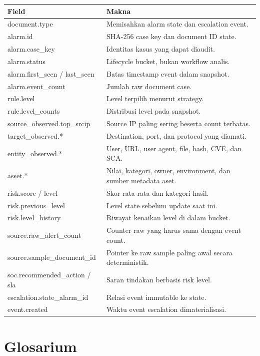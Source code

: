\documentclass[11pt,a4paper,oneside]{report}
\begin{document}
\begin{longtable}{>{\ttfamily\raggedright\arraybackslash}p{}p{}}
\toprule
\normalfont\textbf{Field} & \textbf{Makna}\\
\midrule
\endhead
document.type & Memisahkan alarm state dan escalation event.\\
alarm.id & SHA-256 case key dan document ID state.\\
alarm.case\_key & Identitas kasus yang dapat diaudit.\\
alarm.status & Lifecycle bucket, bukan workflow analis.\\
alarm.first\_seen / last\_seen & Batas timestamp event dalam snapshot.\\
alarm.event\_count & Jumlah raw document case.\\
rule.level & Level terpilih menurut strategy.\\
rule.level\_counts & Distribusi level pada snapshot.\\
source\_observed.top\_srcip & Source IP paling sering beserta count terbatas.\\
target\_observed.* & Destination, port, dan protocol yang diamati.\\
entity\_observed.* & User, URL, user agent, file, hash, CVE, dan SCA.\\
asset.* & Nilai, kategori, owner, environment, dan sumber metadata aset.\\
risk.score / level & Skor rata-rata dan kategori hasil.\\
risk.previous\_level & Level state sebelum update saat ini.\\
risk.level\_history & Riwayat kenaikan level di dalam bucket.\\
source.raw\_alert\_count & Counter raw yang harus sama dengan event count.\\
source.sample\_document\_id & Pointer ke raw sample paling awal secara deterministik.\\
soc.recommended\_action / sla & Saran tindakan berbasis risk level.\\
escalation.state\_alarm\_id & Relasi event immutable ke state.\\
event.created & Waktu event escalation dimaterialisasi.\\
\bottomrule
\end{longtable}

\chapter{Glosarium}
\end{document}
